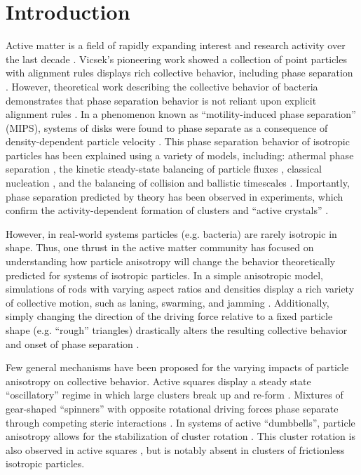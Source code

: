 \section{Introduction}

Active matter is a field of rapidly expanding interest and research activity over the last decade \cite{Ramaswamy_2010_AnnRevConMatPhys,Marchetti_2013_RevModPhys,Bechinger_2016_RevModPhys,Marchetti_2016_CurrentOpinionColloidInterfaceScience}.
Vicsek's pioneering work showed a collection of point particles with alignment rules displays rich collective behavior, including phase separation \cite{Vicsek_1995_PRL}.
However, theoretical work describing the collective behavior of bacteria demonstrates that phase separation behavior is not reliant upon explicit alignment rules \cite{Cates_2010_PNAS}.
In a phenomenon known as ``motility-induced phase separation'' (MIPS), systems of disks were found to phase separate as a consequence of density-dependent particle velocity \cite{Cates_2013_EPL}.
This phase separation behavior of isotropic particles has been explained using a variety of models, including: athermal phase separation \cite{Fily_2012_PRL}, the kinetic steady-state balancing of particle fluxes \cite{Redner_2013_PRE, Redner_2013_PRL}, classical nucleation \cite{Richard_2016_SoftMatter,Redner_2016_PRL}, and the balancing of collision and ballistic timescales \cite{Bruss_2018_PRE}.
Importantly, phase separation predicted by theory has been observed in experiments, which confirm the activity-dependent formation of clusters and ``active crystals'' \cite{Palacci_2013_Science,Petroff_2015_PRL,Briand_2016_PRL}.

However, in real-world systems particles (e.g. bacteria) are rarely isotropic in shape.
Thus, one thrust in the active matter community has focused on understanding how particle anisotropy will change the behavior theoretically predicted for systems of isotropic particles.
In a simple anisotropic model, simulations of rods with varying aspect ratios and densities display a rich variety of collective motion, such as laning, swarming, and jamming \cite{Wensink_2012_JPhysConMat,Wensink_2012_PNAS,Yang_2010_PRE}.
Additionally, simply changing the direction of the driving force relative to a fixed particle shape (e.g. ``rough'' triangles) drastically alters the resulting collective behavior and onset of phase separation \cite{Wensink_2014_PRE,Ilse_2016_JChemPhys}.

Few general mechanisms have been proposed for the varying impacts of particle anisotropy on collective behavior.
Active squares display a steady state ``oscillatory'' regime in which large clusters break up and re-form \cite{Prymidis_2016_SoftMatter}.
Mixtures of gear-shaped ``spinners'' with opposite rotational driving forces phase separate through competing steric interactions \cite{Nguyen_2014_PRL, Sabrina_2015_SoftMatter, Spellings_2015_PNAS}.
In systems of active ``dumbbells'', particle anisotropy allows for the stabilization of cluster rotation \cite{Suma_2014_EPL, Cugliandolo_2017_PRL}.
This cluster rotation is also observed in active squares \cite{Prymidis_2016_SoftMatter}, but is notably absent in clusters of frictionless isotropic particles.

